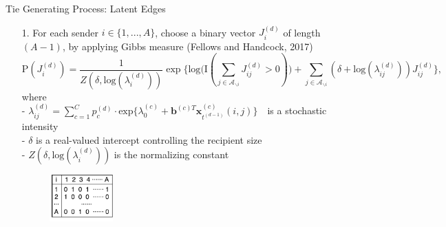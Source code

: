 \documentclass[10pt]{beamer}
\theoremstyle{definition}
\theoremstyle{remark}
\begin{document}
\begin{frame}{Tie Generating Process: Latent Edges}
		\begin{itemize}
		\item[1.] For each sender $i \in \{1,...,A\}$, choose a binary vector $J^{(d)}_i$ of length $(A-1)$, by applying Gibbs measure (Fellows and Handcock, 2017) 
		\footnotesize
		\begin{equation*} \text{P}(J_i^{(d)}) = \frac{1}{Z(\delta,\mbox{log}(\lambda_i^{(d)}))} \exp\Big\{ \mbox{log}\big(\text{I}( \sum_{j \in \mathcal{A}_{\backslash i}} J^{(d)}_{ij} > 0 )\big) + \sum_{j \in \mathcal{A}_{\backslash i}} (\delta+\mbox{log}(\lambda_{ij}^{(d)}))J_{ij}^{(d)} \Big\},
		\end{equation*}
		\normalsize
		where\\\vspace{0.1cm}
		- \footnotesize$\lambda^{(d)}_{ij}=\sum\limits_{c=1}^{C} p^{(d)}_c
		\cdot  \mbox{exp}\Big\{\lambda^{(c)}_0 + \boldsymbol{b}^{(c)T}\boldsymbol{x}^{(c)}_{t^{(d-1)}}(i, j)\Big\}\quad$\normalsize  is a stochastic intensity\\\vspace{0.1cm}
		- $\delta$ is a real-valued intercept controlling the recipient size\\ \vspace{0.1cm}
		- $Z(\delta,\mbox{log}(\lambda_i^{(d)}))$ is the normalizing constant\vspace{0.1cm}
 \begin{figure}
 	\includegraphics[width=0.23\textwidth]{figures/table.pdf}
 \end{figure}	
	\end{itemize}
	\end{frame}
\end{document}
